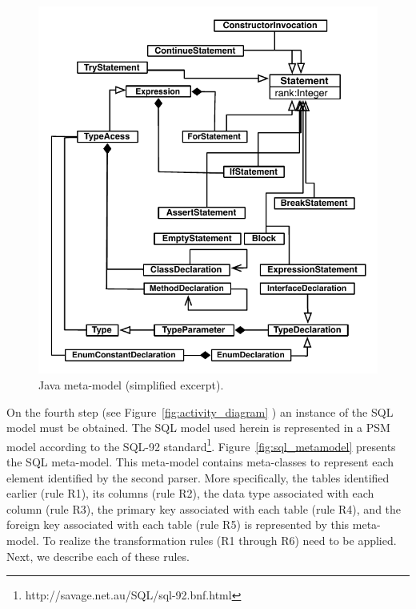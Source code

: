 \documentclass[a4paper,twoside]{article}
\newcommand*\circled[1]{\tikz[baseline=(char.base)]{
  \node[shape=circle,draw, inner sep=0.1pt] (char) {#1};}
}
\begin{document}
\begin{figure}[!h]
\centering
  \includegraphics[scale=0.74]{figuras/JavaMOdelNovo}
\caption{Java meta-model (simplified excerpt).}
\label{fig:java_metamodel}
\end{figure}

On the fourth step (see Figure~\ref{fig:activity_diagram} \circled{\textbf{D}}) an instance of the SQL model must be obtained. The SQL model used herein is represented in a PSM model according to the SQL-92 standard\footnote{http://savage.net.au/SQL/sql-92.bnf.html}. Figure~\ref{fig:sql_metamodel} presents the SQL meta-model. This meta-model contains meta-classes to represent each element identified by the second parser. More specifically, the tables identified earlier (rule R1), its columns (rule R2), the data type associated with each column (rule R3), the primary key associated with each table (rule R4), and the foreign key associated with each table (rule R5) is represented by this meta-model. To realize the transformation rules (R1 through R6) need to be applied. Next, we describe each of these rules.
\end{document}
